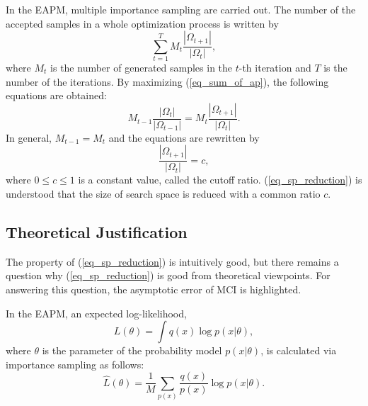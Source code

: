 In the EAPM,
multiple importance sampling are carried out.
The number of the accepted samples 
in a whole optimization process 
is written by
\begin{equation}
 \sum_{t=1}^{T} M_t \frac{|\Omega_{t+1}|}{|\Omega_{t}|},
\label{eq_sum_of_ap}
\end{equation}
where $M_t$ is the number of generated samples in the $t$-th iteration
and
$T$ is the number of the iterations.
By maximizing (\ref{eq_sum_of_ap}),
the following equations are obtained:
\begin{equation}
 M_{t-1}\frac{|\Omega_{t}|}{|\Omega_{t-1}|}=
 M_{t}\frac{|\Omega_{t+1}|}{|\Omega_{t}|}.
\label{eq_ers_max_cond}
\end{equation}
In general, $M_{t-1}=M_t$ and the equations are
rewritten by
\begin{equation}
\frac{|\Omega_{t+1}|}{|\Omega_{t}|}=c,
\label{eq_sp_reduction}
\end{equation}
where $0 \leq c \leq 1$ is a constant value, called the cutoff ratio.
(\ref{eq_sp_reduction}) is understood that
the size of search space is reduced with a common ratio $c$.


\subsection{Theoretical Justification}
The property of (\ref{eq_sp_reduction}) is intuitively good,
but there remains a question why (\ref{eq_sp_reduction})
is good from theoretical viewpoints.
For answering this question, 
the asymptotic error of MCI is highlighted.

In the EAPM, an expected log-likelihood, 
\begin{equation}
 L(\theta)=\int q(x) \log p(x|\theta),
\end{equation}
where $\theta$ is the parameter of the probability model $p(x|\theta)$,
is calculated via importance sampling as follows:
\begin{equation}
 \hat L(\theta) = \frac{1}{M} \sum_{p(x)} \frac{q(x)}{p(x)} \log p(x|\theta).
\end{equation}

